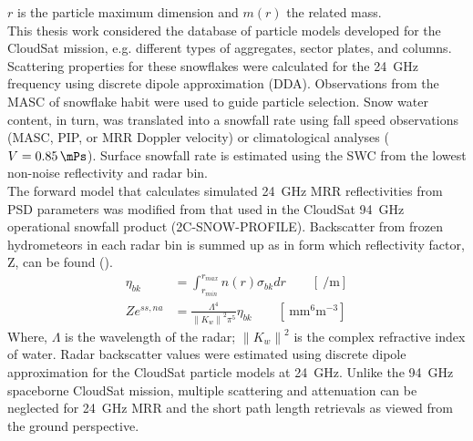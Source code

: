 $r$ is the particle maximum dimension and $m(r)$ the related mass. 
\\
This thesis work considered the database of particle models developed for the CloudSat mission, e.g. different types of aggregates, sector plates, and columns. Scattering properties for these snowflakes were calculated for the \SI{24}{\giga\hertz} frequency using discrete dipole approximation (DDA). Observations from the MASC of snowflake habit were used to guide particle selection. Snow water content, in turn, was translated into a snowfall rate using fall speed observations (MASC, PIP, or MRR Doppler velocity) or climatological analyses ($V = \SI{0.85}{\mPs}$). Surface snowfall rate is estimated using the SWC from the lowest non-noise reflectivity and radar bin. 
\\
The forward model that calculates simulated \SI{24}{\giga\hertz} MRR reflectivities from PSD parameters was modified from that used in the CloudSat \SI{94}{\giga\hertz} operational snowfall product (2C-SNOW-PROFILE). Backscatter from frozen hydrometeors in each radar bin is summed up as in  form which reflectivity factor, Z, can be found (). 
\begin{align}
	\eta_{bk} & = \int_{r_{min}}^{r_{max}} n(r) \sigma_{bk} dr \qquad [\SI{}{\per\metre}] \label{eq:backscatter} \\
	Ze^{ss,na} & = \frac{\Lambda^4}{\left\| K_w \right\|^2 \pi^5} \eta_{bk} \qquad [\SI{}{\mm^6\metre^{-3}}] \label{eq:singleZ}
\end{align}
Where, $\Lambda$ is the wavelength of the radar; $\left\| K_w \right\|^2$ is the complex refractive index of water. Radar backscatter values were estimated using discrete dipole approximation for the CloudSat particle models at \SI{24}{\giga\hertz}. Unlike the \SI{94}{\giga\hertz} spaceborne CloudSat mission, multiple scattering and attenuation can be neglected for \SI{24}{\giga\hertz} MRR and the short path length retrievals as viewed from the ground perspective.  


